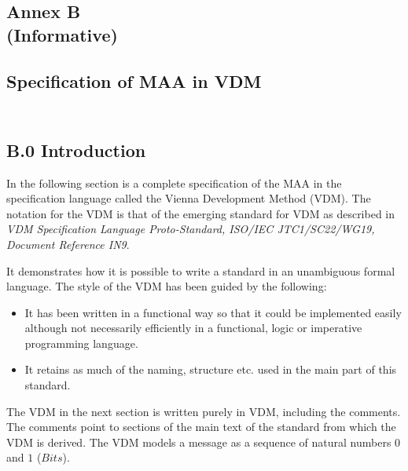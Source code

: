 \documentclass{article}
\begin{document}
\begin{center}
\section*{{Annex B} \\
  {\normalsize (Informative)} \\
          {\ } \\
  {Specification of MAA in VDM} \\
          {\ }} 
\end{center}
\subsection*{B.0 Introduction}
 
In the following section is a complete specification of the MAA in the
specification language called the Vienna Development Method (VDM). The
notation  for the VDM is that of the emerging standard for VDM as described
in {\sl VDM Specification Language Proto-Standard, 
ISO/IEC JTC1/SC22/WG19, Document Reference IN9}.
  
It demonstrates how it is possible to write a standard in an unambiguous
formal language.
The style of the VDM has been guided by the following:
\begin{itemize}
\item It has been written in a functional way so that it could be
      implemented easily although not necessarily efficiently
      in a functional, logic or imperative programming language.
\item It retains as much of the naming, structure etc. used in the
      main part of this standard.
\end{itemize}

The VDM in the next section is written purely in VDM, including the comments.
The comments point to sections of the main text of the standard from which
the VDM is derived.
 The VDM models a message as a sequence of natural numbers
$0$ and $1$ ($Bits$).


\end{document}
